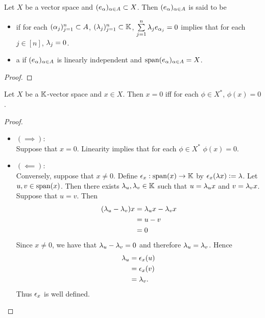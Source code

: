 \documentclass{book}
\begin{document}
 \begin{defn}
 	Let $X$ be a vector space and $(e_{\alpha})_{\alpha \in A} \subset X$. Then $(e_{\alpha})_{\alpha \in A}$ is said to be
 	\begin{itemize}
 		\item {} if for each $(\alpha_j)_{j=1}^n \subset A$, $(\lambda_j)_{j=1}^n \subset \mathbb{K}$, $\sum\limits_{j=1}^n \lambda_j e_{\alpha_j} = 0$ implies that for each $j \in [n]$, $\lambda_j = 0$.  
 		\item a  if $(e_{\alpha})_{\alpha \in A}$ is linearly independent and $\operatorname{span} (e_{\alpha})_{\alpha \in A} = X$. 
 	\end{itemize}
 \end{defn}
 
 \begin{ex}
 \end{ex}
 
 \begin{proof}
 	
 \end{proof}
 
 \begin{ex}
 	
 \end{ex}
 
 
 \begin{ex}
 	Let $X$ be a $\mathbb{K}$-vector space and $x \in X$. Then $x = 0$ iff for each $\phi \in X^*$, $\phi(x) = 0$. 
 \end{ex}
 
 \begin{proof}\
 	\begin{itemize}
 		\item $(\implies)$: \\
 		Suppose that $x = 0$. Linearity implies that for each $\phi \in X^*$ $\phi(x) = 0$. 
 		\item $(\impliedby)$: \\
 		Conversely, suppose that $x \neq 0$. Define $\epsilon_x: \operatorname{span}(x) \rightarrow \mathbb{K}$ by $\epsilon_x(\lambda x) \vcentcolon= \lambda$. Let $u,v \in \operatorname{span}(x)$. Then there exists $\lambda_u, \lambda_v \in \mathbb{K}$ such that $u = \lambda_u x$ and $v = \lambda_v x$. Suppose that $u = v$. Then 
 		\begin{align*}
 			(\lambda_u - \lambda_v)x
 			& = \lambda_u x - \lambda_v x \\
 			& = u - v \\
 			& = 0
 		\end{align*}
 		Since $x \neq 0$, we have that $\lambda_u - \lambda_v = 0$ and therefore $\lambda_u = \lambda_v$. Hence  
 		\begin{align*}
 			\lambda_u 
 			& = \epsilon_x(u) \\
 			& = \epsilon_x(v) \\
 			& = \lambda_v.
 		\end{align*}
 		Thus $\epsilon_x$ is well defined. 
 	\end{itemize}
 \end{proof}
 
\end{document}
